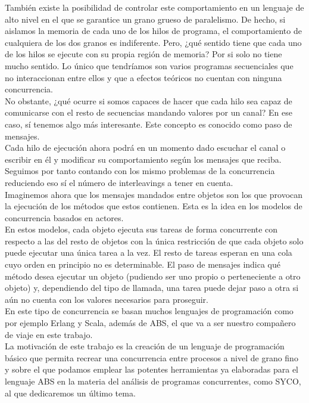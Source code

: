 También existe la posibilidad de controlar este comportamiento en un lenguaje de alto nivel en el que se garantice un grano grueso de paralelismo. De hecho, si aislamos la memoria de cada uno de los hilos de programa, el comportamiento de cualquiera de los dos granos es indiferente. Pero, ¿qué sentido tiene que cada uno de los hilos se ejecute con su propia región de memoria? Por si solo no tiene mucho sentido. Lo único que tendríamos son varios programas secuenciales que no interaccionan entre ellos y que a efectos teóricos no cuentan con ninguna concurrencia.\\

No obstante, ¿qué ocurre si somos capaces de hacer que cada hilo sea capaz de comunicarse con el resto de secuencias mandando valores por un canal? En ese caso, sí tenemos algo más interesante. Este concepto es conocido como paso de mensajes.\\

Cada hilo de ejecución ahora podrá en un momento dado escuchar el canal o escribir en él y modificar su comportamiento según los mensajes que reciba. Seguimos por tanto contando con los mismo problemas de la concurrencia reduciendo eso sí el número de interleavings a tener en cuenta.\\

Imaginemos ahora que los mensajes mandados entre objetos son los que provocan la ejecución de los métodos que estos contienen. Esta es la idea en los modelos de concurrencia basados en actores.\\

En estos modelos, cada objeto ejecuta sus tareas de forma concurrente con respecto a las del resto de objetos con la única restricción de que cada objeto solo puede ejecutar una única tarea a la vez. El resto de tareas esperan en una cola cuyo orden en principio no es determinable. El paso de mensajes indica qué método desea ejecutar un objeto (pudiendo ser uno propio o perteneciente a otro objeto) y, dependiendo del tipo de llamada, una tarea puede dejar paso a otra si aún no cuenta con los valores necesarios para proseguir.\\

En este tipo de concurrencia se basan muchos lenguajes de programación como por ejemplo Erlang y Scala, además de ABS, el que va a ser nuestro compañero de viaje en este trabajo.\\

La motivación de este trabajo es la creación de un lenguaje de programación básico que permita recrear una concurrencia entre procesos a nivel de grano fino y sobre el que podamos emplear las potentes herramientas ya elaboradas para el lenguaje ABS en la materia del análisis de programas concurrentes, como SYCO, al que dedicaremos un último tema.\\

